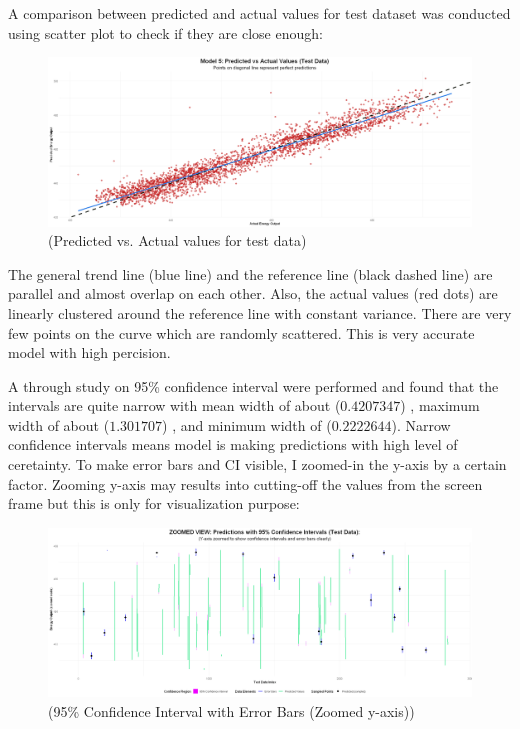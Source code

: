 \documentclass[12pt,a4paper]{article}
\begin{document}
A comparison between predicted and actual values for test dataset was conducted
using scatter plot to check if they are close enough: 

\begin{figure}[H]
  \centering
  \includegraphics[width=\textwidth]{y21.png}
  \caption{(Predicted vs. Actual values for test data)}
  \label{fig:Comparision between predicted and actual values}
\end{figure}


The general trend line (blue line) and the reference line (black dashed line) are parallel and almost
overlap on each other. Also, the actual values (red dots) are linearly clustered around the reference
line with constant variance. There are very few points on the curve which are randomly scattered. This 
is very accurate model with high percision. 

A through study on 95\% confidence interval were performed and found that the intervals are
quite narrow with mean width of about ($0.4207347$) , maximum width of about ($1.301707$) , and 
minimum width of ($0.2222644$). Narrow confidence intervals means model is making predictions with 
high level of ceretainty. To make error bars and CI visible, I zoomed-in the y-axis by a certain factor. Zooming y-axis 
may results into cutting-off the values from the screen frame but this is only for visualization purpose: 

\begin{figure}[H]
  \centering
  \includegraphics[width=\textwidth]{y22.png}
  \caption{(95\% Confidence Interval with Error Bars (Zoomed y-axis))}
  \label{fig:CI for testing data with Error Bars}
\end{figure}
\end{document}
